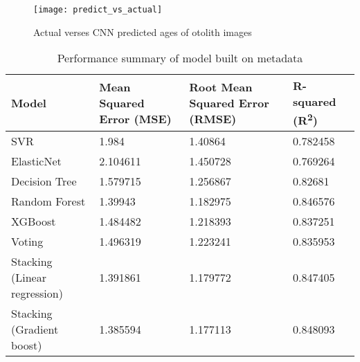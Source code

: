 \pagebreak

\begin{figure}
    \texttt{[image: predict\_vs\_actual]}
    \caption{Actual verses CNN predicted ages of otolith images}
    \label{fig:actual_vs_predicted}
\end{figure}



\pagebreak
\begin{longtable}{| p{} | p{} | p{} | p{} |}
    \caption{Performance summary of model built on metadata}
    \label{tab:simple_models} \\
    \hline
    \textbf{Model} &
    \textbf{Mean Squared Error \newline(MSE)} &
    \textbf{Root Mean Squared Error \newline (RMSE)} &
    \textbf{R-squared (R\textsuperscript{2})} \\
    \hline
    \hline
    SVR &
    1.984 &
    1.40864 &
    0.782458 \\
    \hline
    ElasticNet &
    2.104611 &
    1.450728 &
    0.769264 \\
    \hline
    Decision Tree &
    1.579715 &
    1.256867 &
    0.82681 \\
    \hline
    Random Forest &
    1.39943 &
    1.182975 &
    0.846576 \\
    \hline
    XGBoost &
    1.484482 &
    1.218393 &
    0.837251 \\
    \hline
    Voting &
    1.496319 &
    1.223241 &
    0.835953 \\
    \hline
    Stacking \newline(Linear regression) &
    1.391861 &
    1.179772 &
    0.847405 \\
    \hline
    Stacking \newline(Gradient boost) &
    1.385594 &
    1.177113 &
    0.848093 \\
    \hline
\end{longtable}

